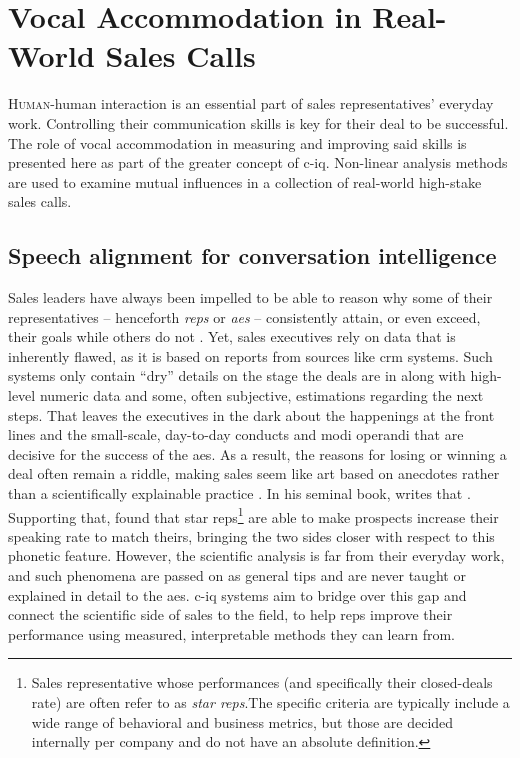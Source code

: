\chapter{Vocal Accommodation in Real-World Sales Calls}
\label{chap:conv_analysis}

\lettrine{H}{uman}-human interaction is an essential part of sales representatives' everyday work.
Controlling their communication skills is key for their deal to be successful.
The role of vocal accommodation in measuring and improving said skills is presented here as part of the greater concept of \acl{c-iq}.
Non-linear analysis methods are used to examine mutual influences in a collection of real-world high-stake sales calls.

\pagebreak

\section{Speech alignment for conversation intelligence}
\label{sec:conversation_intelligence}

Sales leaders have always been impelled to be able to reason why some of their representatives -- henceforth \emph{reps} or \emph{\acp{ae}} -- consistently attain, or even exceed, their goals while others do not \citep[see overview in][]{Kovac2017its}.
Yet, sales executives rely on data that is inherently flawed, as it is based on reports from sources like \ac{crm} systems.
Such systems only contain \enquote{dry} details on the stage the deals are in along with high-level numeric data and some, often subjective, estimations regarding the next steps.
That leaves the executives in the dark about the happenings at the front lines and the small-scale, day-to-day conducts and modi operandi that are decisive for the success of the \acp{ae}.
As a result, the reasons for losing or winning a deal often remain a riddle, making sales seem like art based on anecdotes rather than a scientifically explainable practice \citep{Yohn2016best, Martin2017six}.
In his seminal book, \citet{Gladwell2006tipping} writes that .
Supporting that, \citet{Orlob2018nine} found that star reps\footnote{Sales representative whose performances (and specifically their closed-deals rate) are often refer to as \emph{star reps}.The specific criteria are typically include a wide range of behavioral and business metrics, but those are decided internally per company and do not have an absolute definition.} are able to make prospects increase their speaking rate to match theirs, bringing the two sides closer with respect to this phonetic feature.
However, the scientific analysis is far from their everyday work, and such phenomena are passed on as general tips and are never taught or explained in detail to the \acp{ae}.
\Ac{c-iq} systems aim to bridge over this gap and connect the scientific side of sales to the field, to help reps improve their performance using measured, interpretable methods they can learn from.

